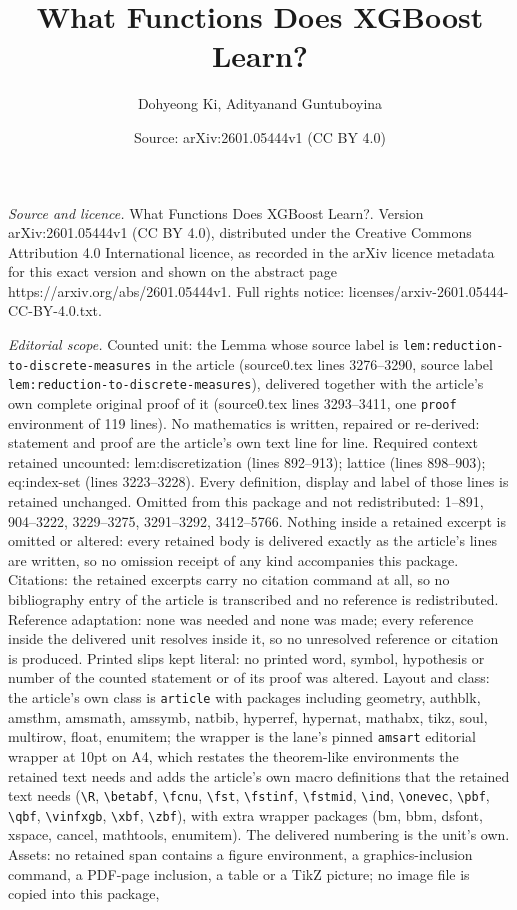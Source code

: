 \documentclass[10pt,a4paper]{amsart}
\title[What Functions Does XGBoost Learn?]{What Functions Does XGBoost Learn?}
\author{Dohyeong Ki, Adityanand Guntuboyina}
\date{Source: arXiv:2601.05444v1 (CC BY 4.0)}
\begin{document}
\maketitle

\noindent\emph{Source and licence.} What Functions Does XGBoost Learn?. Version arXiv:2601.05444v1 (CC BY 4.0), distributed under the Creative Commons Attribution 4.0 International licence, as recorded in the arXiv licence metadata for this exact version and shown on the abstract page https://arxiv.org/abs/2601.05444v1. Full rights notice: licenses/arxiv-2601.05444-CC-BY-4.0.txt.\par\smallskip

\noindent\textit{Editorial scope.} Counted unit: the Lemma whose source label is \texttt{lem:reduction-to-discrete-measures} in the article (source0.tex lines 3276--3290, source label \texttt{lem:reduction-to-discrete-measures}), delivered together with the article's own complete original proof of it (source0.tex lines 3293--3411, one \texttt{proof} environment of 119 lines). No mathematics is written, repaired or re-derived: statement and proof are the article's own text line for line. Required context retained uncounted: lem:discretization (lines 892--913); lattice (lines 898--903); eq:index-set (lines 3223--3228). Every definition, display and label of those lines is retained unchanged. Omitted from this package and not redistributed: 1--891, 904--3222, 3229--3275, 3291--3292, 3412--5766. Nothing inside a retained excerpt is omitted or altered: every retained body is delivered exactly as the article's lines are written, so no omission receipt of any kind accompanies this package. Citations: the retained excerpts carry no citation command at all, so no bibliography entry of the article is transcribed and no reference is redistributed. Reference adaptation: none was needed and none was made; every reference inside the delivered unit resolves inside it, so no unresolved reference or citation is produced. Printed slips kept literal: no printed word, symbol, hypothesis or number of the counted statement or of its proof was altered. Layout and class: the article's own class is \texttt{article} with packages including geometry, authblk, amsthm, amsmath, amssymb, natbib, hyperref, hypernat, mathabx, tikz, soul, multirow, float, enumitem; the wrapper is the lane's pinned \texttt{amsart} editorial wrapper at 10pt on A4, which restates the theorem-like environments the retained text needs and adds the article's own macro definitions that the retained text needs (\texttt{\textbackslash R}, \texttt{\textbackslash betabf}, \texttt{\textbackslash fcnu}, \texttt{\textbackslash fst}, \texttt{\textbackslash fstinf}, \texttt{\textbackslash fstmid}, \texttt{\textbackslash ind}, \texttt{\textbackslash onevec}, \texttt{\textbackslash pbf}, \texttt{\textbackslash qbf}, \texttt{\textbackslash vinfxgb}, \texttt{\textbackslash xbf}, \texttt{\textbackslash zbf}), with extra wrapper packages (bm, bbm, dsfont, xspace, cancel, mathtools, enumitem). The delivered numbering is the unit's own. Assets: no retained span contains a figure environment, a graphics-inclusion command, a PDF-page inclusion, a table or a TikZ picture; no image file is copied into this package, 
\end{document}
